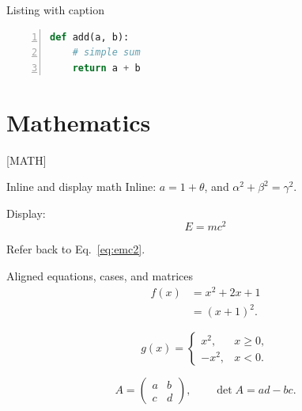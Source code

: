\documentclass[aspectratio=169]{beamer}
\begin{document}
\begin{frame}[fragile]{Listing with caption}
\begin{lstlisting}[language=Python, basicstyle=\ttfamily\small,
                   keywordstyle=\color{IISTPrimary}\bfseries,
                   commentstyle=\color{IISTMuted}\itshape,
                   stringstyle=\color{IISTExample},
                   numbers=left, numberstyle=\tiny,
                   frame=single, caption={Add two numbers}]
def add(a, b):
    # simple sum
    return a + b
\end{lstlisting}
\end{frame}

\section{Mathematics}  [MATH]
\begin{frame}{Inline and display math}
    Inline: $a = 1 + \theta$, and $\alpha^2 + \beta^2 = \gamma^2$.

    \medskip
    Display:
    \begin{equation}
        E = mc^2
        \label{eq:emc2}
    \end{equation}

    Refer back to Eq.~\eqref{eq:emc2}.
\end{frame}

\begin{frame}{Aligned equations, cases, and matrices}
    \begin{align}
        f(x)   &= x^2 + 2x + 1 \\
               &= (x+1)^2.
    \end{align}

    \begin{equation}
        g(x) =
        \begin{cases}
            x^2,   & x \ge 0, \\
            -x^2,  & x < 0.
        \end{cases}
    \end{equation}

    \begin{equation}
        A = \begin{pmatrix}
            a & b \\
            c & d
        \end{pmatrix},
        \qquad
        \det A = ad - bc.
    \end{equation}
\end{frame}
\end{document}
